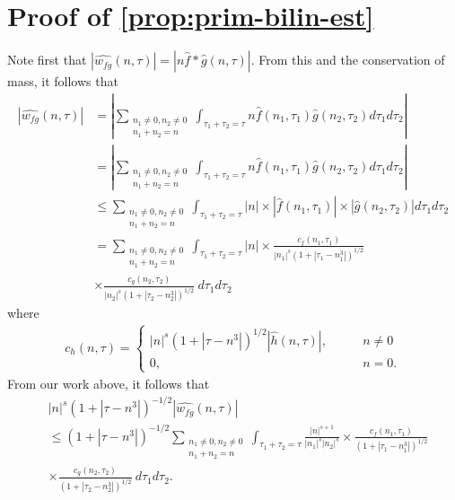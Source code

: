 \documentclass[12pt,reqno]{amsart}
\numberwithin{equation}{section}  %
\numberwithin{figure}{section}
\newcommand{\wh}{\widehat}
\theoremstyle{plain}
\theoremstyle{definition}
\theoremstyle{remark}
\begin{document}
\section{ Proof of \autoref{prop:prim-bilin-est}}
Note first that $|\wh{w_{fg}}(n, \tau) |  = | n\wh{f} *  \wh{g} 
(n, \tau)|$. From this and the conservation of mass, it follows that
%
%
\begin{equation}
	\label{non-lin-rep}
	\begin{split}
		| \wh{w_{fg}}(n, \tau)|
		& = | \sum_{\substack{n_1 \neq 0, n_2 \neq 0 \\n_1 +n_2 =n}}  \int_{\tau_1 + \tau_2 = \tau}n\wh{f}\left( n_1,  \tau_1 
\right) \wh{g}\left( n_2, \tau_2  
\right) d \tau_1 d \tau_2 |
\\
& = | \sum_{\substack{n_1 \neq0, n_2 \neq 0 \\n_1 + n_2 =n}}  \int_{\tau_1 + \tau_2 = \tau}n\wh{f}\left( n_1,  \tau_1 
\right) \wh{g}\left( n_2, \tau_2  
\right) d \tau_1 d \tau_2 | 
\\
& \le \sum_{\substack{n_1 \neq0, n_2 \neq 0 \\n_1 + n_2 =n}}   \int_{\tau_1 + \tau_2 = \tau}| n | \times | \wh{f}\left( n_1, \tau_1 
\right) | \times  | \wh{g}\left( n_2, \tau_2 
\right) |   d \tau_1 d \tau_2  
\\
& = \sum_{\substack{n_1 \neq0, n_2 \neq 0 \\n_1 + n_2 =n}} \int_{\tau_1 + \tau_2 = \tau}| n | \times \frac{c_f\left( n_1, \tau_1 
\right)}{|n_1|^s \left( 1 + | \tau_1 - n_1^3 | \right)^{1/2}}
\\
& \times \frac{c_{g}\left( n_2, \tau_2 \right)}{|n_2|^s\left( 1 + | \tau_2 -  n_2^3| 
\right)^{1/2}}
  \ d \tau_1 d \tau_2 
\end{split}
\end{equation}
%
%
where 
%
%
\begin{equation*}
	\begin{split}
		c_h(n, \tau) =
		\begin{cases}
			|n|^s \left( 1 + | \tau - n^3 |  
			\right)^{1/2} | \wh{h}\left( n, \tau \right) |, \qquad & n \neq 0
		\\
		0, \qquad & n = 0.
	\end{cases}
	\end{split}
\end{equation*}
%
%
From our work above, it follows that 
%
%
\begin{equation}
	\label{convo-est-starting-pnt}
	\begin{split}
		 & |n|^s \left( 1 + | \tau - n^3 | \right)^{-1/2} | \wh{w_{fg}}\left( 
		n, \tau \right) |
		\\
		& \le \left( 1 + | \tau - n^3 | \right)^{-1/2}
		\sum_{\substack{n_1 \neq0, n_2 \neq 0 \\n_1 + n_2 =n}} \int_{\tau_1 + \tau_2 = \tau}\frac{|n|^{s+1}}{|n_1|^s | n_2|^s} 
		\times \frac{c_f(n_1, \tau_1)}{\left( 1 + | \tau_1 - n_1^3 | 
		\right)^{1/2}}
		\\
		& \times
		\frac{c_g(n_2, \tau_2)}{\left( 1 + | \tau_2 - n_2^3 | 
		\right)^{1/2}}\ d \tau_1 d \tau_2.
	\end{split}
\end{equation}
\end{document}
